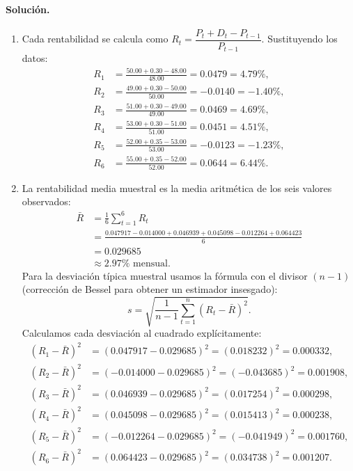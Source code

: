 \documentclass[12pt,a4paper]{article}
\newenvironment{solucion}{\paragraph{Solución.}}{}
\begin{document}
\begin{solucion}
\begin{enumerate}[label=\alph*)]
  \item Cada rentabilidad se calcula como $R_t = \dfrac{P_t + D_t - P_{t-1}}{P_{t-1}}$. Sustituyendo los datos:
  \begin{align*}
  R_1 &= \frac{50.00 + 0.30 - 48.00}{48.00} = 0.0479 = 4.79\%,\\[-3pt]
  R_2 &= \frac{49.00 + 0.30 - 50.00}{50.00} = -0.0140 = -1.40\%,\\[-3pt]
  R_3 &= \frac{51.00 + 0.30 - 49.00}{49.00} = 0.0469 = 4.69\%,\\[-3pt]
  R_4 &= \frac{53.00 + 0.30 - 51.00}{51.00} = 0.0451 = 4.51\%,\\[-3pt]
  R_5 &= \frac{52.00 + 0.35 - 53.00}{53.00} = -0.0123 = -1.23\%,\\[-3pt]
  R_6 &= \frac{55.00 + 0.35 - 52.00}{52.00} = 0.0644 = 6.44\%.
  \end{align*}
  \item La rentabilidad media muestral es la media aritmética de los seis valores observados:
  \begin{align*}
  \bar{R} &= \frac{1}{6}\sum_{t=1}^6 R_t \\
          &= \frac{0.047917 - 0.014000 + 0.046939 + 0.045098 - 0.012264 + 0.064423}{6} \\
          &= 0.029685 \\ 
          &\approx 2.97\%\text{ mensual}.
  \end{align*}
  Para la desviación típica muestral usamos la fórmula con el divisor $(n-1)$ (corrección de Bessel para obtener un estimador insesgado):
  \[
  s = \sqrt{\frac{1}{n-1}\sum_{t=1}^n (R_t - \bar{R})^2}.
  \]
  Calculamos cada desviación al cuadrado explícitamente:
  \begin{align*}
  (R_1 - \bar{R})^2 &= (0.047917 - 0.029685)^2 = (0.018232)^2 = 0.000332,\\
  (R_2 - \bar{R})^2 &= (-0.014000 - 0.029685)^2 = (-0.043685)^2 = 0.001908,\\
  (R_3 - \bar{R})^2 &= (0.046939 - 0.029685)^2 = (0.017254)^2 = 0.000298,\\
  (R_4 - \bar{R})^2 &= (0.045098 - 0.029685)^2 = (0.015413)^2 = 0.000238,\\
  (R_5 - \bar{R})^2 &= (-0.012264 - 0.029685)^2 = (-0.041949)^2 = 0.001760,\\
  (R_6 - \bar{R})^2 &= (0.064423 - 0.029685)^2 = (0.034738)^2 = 0.001207.
  \end{align*}

\end{enumerate}
\end{solucion}
\end{document}
